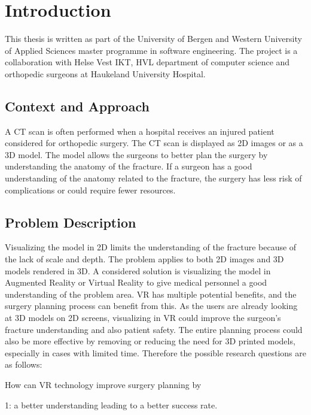 \documentclass[a4paper]{report}
\begin{document}

\chapter{Introduction}
This thesis is written as part of the University of Bergen and Western University of Applied Sciences master programme in software engineering. The project is a collaboration with Helse Vest IKT, HVL department of computer science and orthopedic surgeons at Haukeland University Hospital.

\section{Context and Approach}
A CT scan is often performed when a hospital receives an injured patient considered for orthopedic surgery. The CT scan is displayed as 2D images or as a 3D model. The model allows the surgeons to better plan the surgery by understanding the anatomy of the fracture.
If a surgeon has a good understanding of the anatomy related to the fracture,
the surgery has less risk of complications or could require fewer resources.

\section{Problem Description}
Visualizing the model in 2D limits the understanding of the fracture because of the lack of scale and depth. The problem applies to both 2D images and 3D models rendered in 3D.
A considered solution is visualizing the model in Augmented Reality or Virtual Reality to give medical personnel a good understanding of the problem area.
VR has multiple potential benefits, and the surgery planning process can benefit from this. As the users are already looking at 3D models on 2D screens, visualizing in VR could improve the surgeon's fracture understanding and also patient safety. The entire planning process could also be more effective by removing or reducing the need for 3D printed models, especially in cases with limited time.
Therefore the possible research questions are as follows:

How can VR technology improve surgery planning by

1: a better understanding leading to a better success rate.
\end{document}
